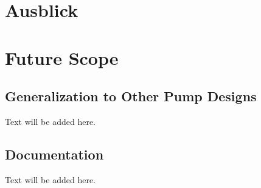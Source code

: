  {\chapter{Ausblick}}
  {\chapter{Future Scope}}

\label{sec:conclusion}

\section{Generalization to Other Pump Designs}
Text will be added here.

\section{Documentation}
Text will be added here.
